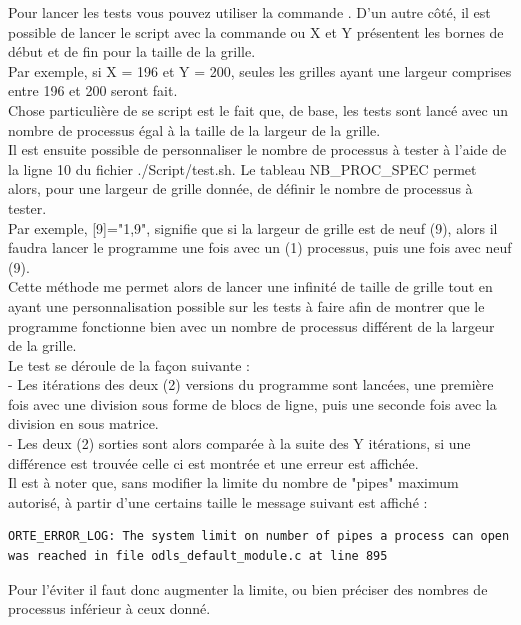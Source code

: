 \documentclass[10pt,a4paper]{article}
\begin{document}
Pour lancer les tests vous pouvez utiliser la commande . D'un autre côté, il est possible de lancer le script avec la commande   ou X et Y présentent les bornes de début et de fin pour la taille de la grille. \\
Par exemple, si X = 196 et Y = 200, seules les grilles ayant une largeur comprises entre 196 et 200 seront fait. \\

Chose particulière de se script est le fait que, de base, les tests sont lancé avec un nombre de processus égal à la taille de la largeur de la grille.\\
Il est ensuite possible de personnaliser le nombre de processus à tester à l'aide de la ligne 10 du fichier ./Script/test.sh. Le tableau NB\_PROC\_SPEC permet alors, pour une largeur de grille donnée, de définir le nombre de processus à tester.\\
Par exemple, [9]="1,9", signifie que si la largeur de grille est de neuf (9), alors il faudra lancer le programme une fois avec un (1) processus, puis une fois avec neuf (9). \\
Cette méthode me permet alors de lancer une infinité de taille de grille tout en ayant une personnalisation possible sur les tests à faire afin de montrer que le programme fonctionne bien avec un nombre de processus différent de la largeur de la grille. \\

Le test se déroule de la façon suivante : \\
\indent - Les itérations des deux (2) versions du programme sont lancées, une première fois avec une division sous forme de blocs de ligne, puis une seconde fois avec la division en sous matrice. \\
\indent - Les deux (2) sorties sont alors comparée à la suite des Y itérations, si une différence est trouvée celle ci est montrée et une erreur est affichée.\\

Il est à noter que, sans modifier la limite du nombre de "pipes" maximum autorisé, à partir d'une certains taille le message suivant est affiché :
\begin{verbatim}
ORTE_ERROR_LOG: The system limit on number of pipes a process can open 
was reached in file odls_default_module.c at line 895
\end{verbatim}
Pour l'éviter il faut donc augmenter la limite, ou bien préciser des nombres de processus inférieur à ceux donné. \\
\end{document}
